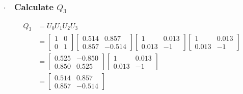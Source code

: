 \subsubsection{$\cdot\quad$Calculate $Q_3$}
\begin{align*}
    Q_3 &= U_0 U_1 U_2 U_3\\
    &= \begin{bmatrix}
        1&0\\0&1
    \end{bmatrix}\begin{bmatrix}
        0.514 & 0.857\\
        0.857 & -0.514
    \end{bmatrix}\begin{bmatrix}
        1 & 0.013\\
        0.013 & -1
    \end{bmatrix}\begin{bmatrix}
        1 & 0.013\\
        0.013 & -1
    \end{bmatrix}\\
    &= \begin{bmatrix}
        0.525&-0.850\\
        0.850&0.525
    \end{bmatrix} \begin{bmatrix}
        1 & 0.013\\
        0.013 & -1
    \end{bmatrix}\\
    &= \begin{bmatrix}
        0.514 & 0.857\\
        0.857 & -0.514
    \end{bmatrix}
\end{align*}

